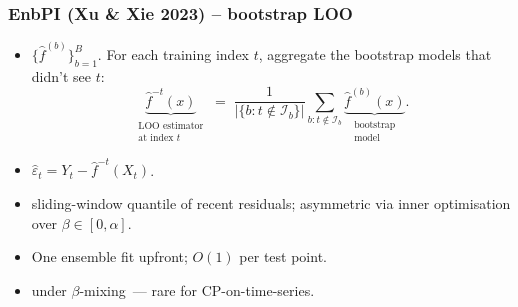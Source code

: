 \documentclass[11pt, aspectratio=169, xcolor={dvipsnames}, usepdftitle=false]{beamer}
\begin{document}
\begin{frame}
\frametitle{EnbPI (Xu \& Xie 2023) -- bootstrap LOO}
\begin{itemize}
\item {} $\{\hat{f}^{(b)}\}_{b=1}^B$. For each training index $t$, aggregate  the bootstrap models that didn't see $t$:
\begin{equation*}
\underbrace{\hat{f}^{-t}(x)}_{\substack{\text{LOO estimator}\\\text{at index } t}}
\;=\;
\frac{1}{|\{b : t \notin \mathcal{I}_b\}|}
\sum_{b : t \notin \mathcal{I}_b}
\underbrace{\hat{f}^{(b)}(x)}_{\substack{\text{bootstrap}\\\text{model}}}.
\end{equation*}
\item {} $\hat{\varepsilon}_t = Y_t - \hat{f}^{-t}(X_t)$.
\item {} sliding-window quantile of recent residuals; asymmetric via inner optimisation over $\beta \in [0, \alpha]$.
\item {} One ensemble fit upfront; $O(1)$ per test point.
\item {} under $\beta$-mixing~--- rare for CP-on-time-series.
\end{itemize}
\end{frame}
\end{document}
